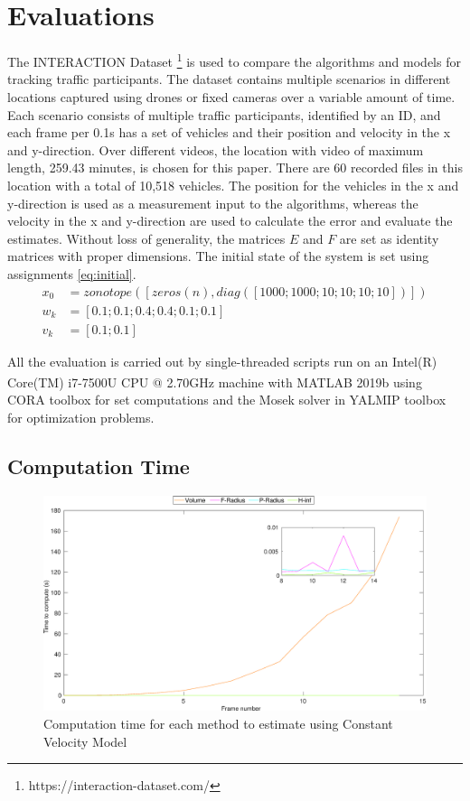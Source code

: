 \chapter{Evaluations} \label{ch:result}
The INTERACTION Dataset \footnote{https://interaction-dataset.com/} is used to compare the algorithms and models for tracking traffic participants. The dataset contains multiple scenarios in different locations captured using drones or fixed cameras over a variable amount of time. Each scenario consists of multiple traffic participants, identified by an ID, and each frame per 0.1s has a set of vehicles and their position and velocity in the x and y-direction. Over different videos, the location with video of maximum length, 259.43 minutes, is chosen for this paper. There are 60 recorded files in this location with a total of 10,518 vehicles. The position for the vehicles in the x and y-direction is used as a measurement input to the algorithms, whereas the velocity in the x and y-direction are used to calculate the error and evaluate the estimates. Without loss of generality, the matrices $E$ and $F$ are set as identity matrices with proper dimensions. The initial state of the system is set using assignments \eqref{eq:initial}.
\begin{equation}
\label{eq:initial}
\begin{split}
x_0 &= zonotope([zeros(n), diag([1000;1000;10;10;10;10])])\\
w_k &= [0.1;0.1;0.4;0.4;0.1;0.1]\\
v_k &= [0.1;0.1]
\end{split}
\end{equation}

All the evaluation is carried out by single-threaded scripts run on an Intel(R) Core(TM) i7-7500U CPU @ 2.70GHz machine with MATLAB\textsuperscript{\tiny\textregistered} 2019b using CORA toolbox for set computations and the Mosek solver in YALMIP toolbox for optimization problems.

\section{Computation Time}
\begin{figure}[htbp]
\centering
\includegraphics[width=\linewidth]{figures/timegraphh}
\caption{Computation time for each method to estimate using Constant Velocity Model}
\label{fig:timegraph}
\end{figure}

